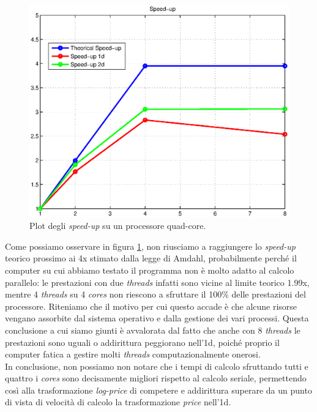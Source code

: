 \documentclass[a4paper,10pt]{report}
\theoremstyle{plain}
\theoremstyle{definition}
\theoremstyle{remark}
\begin{document}
\begin{figure}[htp!]
\begin{center}
\includegraphics[width=12cm]{img/test4-speedup.eps}
\caption{Plot degli \emph{speed-up} su un processore quad-core.}
\label{test4:speedup}
\end{center}
\end{figure}
Come possiamo osservare in figura \ref{test4:speedup}, non riusciamo a raggiungere lo \emph{speed-up} teorico prossimo ai 4x stimato dalla legge di Amdahl, probabilmente perch\'e il computer su cui abbiamo testato il programma non \`e molto adatto al calcolo parallelo: le prestazioni con due \emph{threads} infatti sono vicine al limite teorico 1.99x, mentre 4 \emph{threads} su 4 \emph{cores} non riescono a sfruttare il 100\% delle prestazioni del processore. Riteniamo che il motivo per cui questo accade \`e che alcune risorse vengano assorbite dal sistema operativo e dalla gestione dei vari processi. Questa conclusione a cui siamo giunti \`e avvalorata dal fatto che anche con 8 \emph{threads} le prestazioni sono uguali o addirittura peggiorano nell'1d, poich\'e proprio il computer fatica a gestire molti \emph{threads} computazionalmente onerosi.\\In conclusione, non possiamo non notare che i tempi di calcolo sfruttando tutti e quattro i \emph{cores} sono decisamente migliori rispetto al calcolo seriale, permettendo cos\`i alla trasformazione \emph{log-price} di competere e addirittura superare da un punto di vista di velocit\`a di calcolo la trasformazione \emph{price} nell'1d.
\newpage
\end{document}
